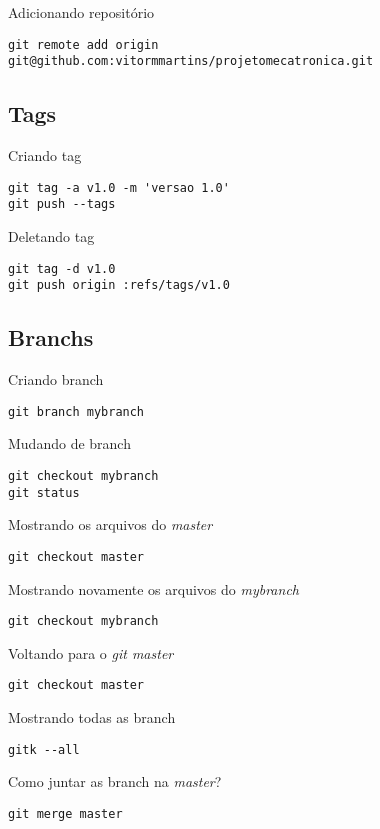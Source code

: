 \documentclass[a4paper]{article}
\begin{document}
Adicionando repositório
\begin{lstlisting}
git remote add origin git@github.com:vitormmartins/projetomecatronica.git
\end{lstlisting}

\subsection*{Tags}

Criando tag
\begin{lstlisting}
git tag -a v1.0 -m 'versao 1.0'
git push --tags
\end{lstlisting}

Deletando tag
\begin{lstlisting}
git tag -d v1.0
git push origin :refs/tags/v1.0
\end{lstlisting}

\subsection*{Branchs}

Criando branch
\begin{lstlisting}
git branch mybranch
\end{lstlisting}

Mudando de branch
\begin{lstlisting}
git checkout mybranch
git status
\end{lstlisting}

Mostrando os arquivos do \emph{master}
\begin{lstlisting}
git checkout master
\end{lstlisting}

Mostrando novamente os arquivos do \emph{mybranch}
\begin{lstlisting}
git checkout mybranch
\end{lstlisting}

Voltando para o \emph{git master}
\begin{lstlisting}
git checkout master
\end{lstlisting}

Mostrando todas as branch
\begin{lstlisting}
gitk --all
\end{lstlisting}

\newpage 

Como juntar as branch na \emph{master}?
\begin{lstlisting}
git merge master
\end{lstlisting}
\end{document}
